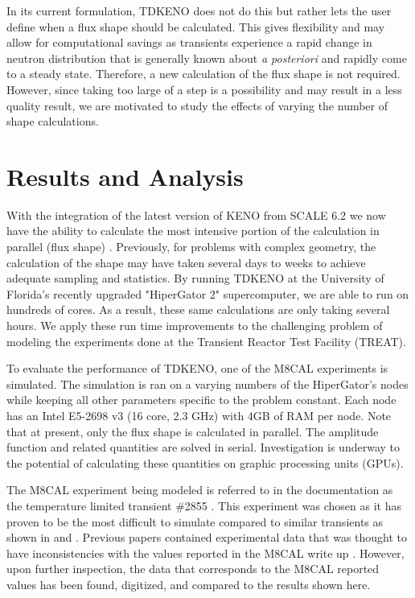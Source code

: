 \documentclass{anstrans}
\begin{document}
 In its current formulation, TDKENO does not do this but rather lets the user define when a flux shape should be calculated.  This gives flexibility and may allow for computational savings as transients experience a rapid change in neutron distribution that is generally known about \emph{a posteriori} and rapidly come to a steady state. Therefore, a new calculation of the flux shape is not required. However, since taking too large of a step is a possibility and may result in a less quality result, we are motivated to study the effects of varying the number of shape calculations.


\section{Results and Analysis}
With the integration of the latest version of KENO from SCALE 6.2 we now have the ability to calculate the most intensive portion of the calculation in parallel (flux shape) \cite{rearden2013overview}.  Previously, for problems with complex geometry, the calculation of the shape may have taken several days to weeks to achieve adequate sampling and statistics.  By running TDKENO at the University of Florida's recently upgraded "HiperGator 2" supercomputer, we are able to run on hundreds of cores. As a result, these same calculations are only taking several hours. We apply these run time improvements to the challenging problem of modeling the experiments done at the Transient Reactor Test Facility (TREAT). 

To evaluate the performance of TDKENO, one of the M8CAL experiments is simulated.  The simulation is ran on a varying numbers of the HiperGator's nodes while keeping all other parameters specific to the problem constant.  Each node has an Intel E5-2698 v3 (16 core, 2.3 GHz) with 4GB of RAM per node. Note that at present, only the flux shape is calculated in parallel.  The amplitude function and related quantities are solved in serial. Investigation is underway to the potential of calculating these quantities on graphic processing units (GPUs).  

The M8CAL experiment being modeled is referred to in the documentation as the temperature limited transient \#2855 \cite{Robinson_Bauer_1994}.  This experiment was chosen as it has proven to be the most difficult to simulate compared to similar transients as shown in \cite{physor_mausolff} and \cite{kontogeorgakos2014treat}.  Previous papers contained experimental data that was thought to have inconsistencies with the values reported in the M8CAL write up \cite{physor_mausolff}\cite{physor_paluch}.  However, upon further inspection, the data that corresponds to the M8CAL reported values has been found, digitized, and compared to the results shown here.
\end{document}
